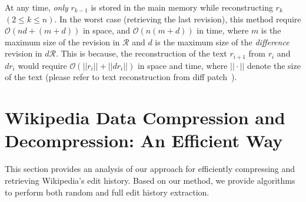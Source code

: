 \documentclass[acmsmall]{acmart}
\begin{document}
At any time, \textit{only} $r_{k-1}$ is stored in the main memory while reconstructing $r_k$ $(2 \leq k \leq n)$. In the worst case (retrieving the last revision), this method require $\mathcal{O}(nd+(m+d))$ in space, and $\mathcal{O}(n(m+d))$ in time, where $m$ is the maximum size of the revision in $\mathcal{R}$ and $d$ is the maximum size of the \emph{difference} revision in $d\mathcal{R}$. This is because, the reconstruction of the text $r_{i+1}$ from $r_i$ and $dr_i$ would require $\mathcal{O}(||r_i||+||dr_i||)$ in space and time, 
where $||\cdot||$ denote the size of the text (please refer to text reconstruction from diff patch~\cite{diffpatch}).


\begin{table}[]
\centering
\caption{Representation of difference between every two consecutive revisions. $mr_i$ and $tr_i$ represents the memory cost saved by storing the difference $dr_i$ and the time cost to retrieve the revision $r_i$ using $r_{i-1}$ and $dr_i$, respectively. $l_i = ||r_i||$ represents the revision length of $i^{th}$ revision and $|.|$ represents the modulus function.}
\label{tab:diff_cost}
\end{table}

\section{Wikipedia Data Compression and Decompression: An Efficient Way}\label{WikiComp}
This section provides an analysis of our approach for efficiently compressing and retrieving Wikipedia's edit history. Based on our method, we provide algorithms to perform both random and full edit history extraction.  
\end{document}
